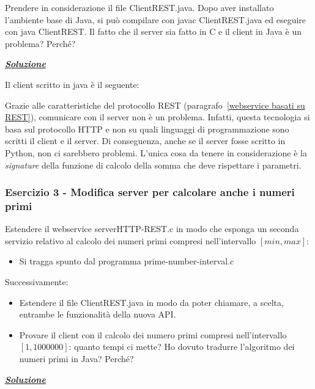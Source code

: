 \documentclass[a4paper]{article}
\begin{document}
	Prendere in considerazione il file \textsf{ClientREST.java}. Dopo aver installato l'ambiente base di Java, si può compilare con \textsf{javac ClientREST.java} ed eseguire con \textsf{java ClientREST}. Il fatto che il server sia fatto in C e il client in Java è un problema? Perché?\newline
	
	\noindent
	\textcolor{Green4}{\underline{\textbf{\emph{Soluzione}}}}\newline
	
	\noindent
	Il client scritto in java è il seguente:
	
	Grazie alle caratteristiche del protocollo REST (paragrafo~\ref{webservice basati su REST}), comunicare con il server non è un problema. Infatti, questa tecnologia si basa sul protocollo HTTP e non su quali linguaggi di programmazione sono scritti il client e il server. Di conseguenza, anche se il server fosse scritto in Python, non ci sarebbero problemi. L'unica cosa da tenere in considerazione è la \emph{signature} della funzione di calcolo della somma che deve rispettare i parametri.\newpage
	
	\subsubsection{Esercizio 3 - Modifica server per calcolare anche i numeri primi}
	
	Estendere il webservice \textsf{serverHTTP-REST.c} in modo che esponga un seconda servizio relativo al calcolo dei numeri primi compresi nell'intervallo $\left[min, max\right]$:
	\begin{itemize}
		\item Si tragga spunto dal programma \textsf{prime-number-interval.c}
	\end{itemize}
	Successivamente:
	\begin{itemize}
		\item Estendere il file \textsf{ClientREST.java} in modo da poter chiamare, a scelta, entrambe le funzionalità della nuova API.
		
		\item Provare il client con il calcolo dei numero primi compresi nell'intervallo $\left[1, 1000000\right]$: quanto tempi ci mette? Ho dovuto tradurre l'algoritmo dei numeri primi in Java? Perché?
	\end{itemize}
	
	\noindent
	\textcolor{Green4}{\underline{\textbf{\emph{Soluzione}}}}\newline
	
\end{document}

